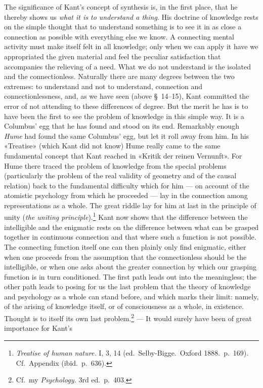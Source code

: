 \documentclass[12pt,a4paper]{article}
\newcommand{\opage}[1]{\marginnote{\footnotesize\textit{[#1]}}}
\begin{document}
The significance of Kant's concept of synthesis is, in the first place, that
he thereby shows us \emph{what it is to understand a thing}. His doctrine of
knowledge rests on the simple thought that to understand something is to see
it in as close a connection as possible with everything else we know. A
connecting mental activity must make itself felt in all knowledge; only when
we can apply it have we appropriated the given material and feel the peculiar
satisfaction that accompanies the relieving of a need. What we do not
understand is the isolated and the connectionless. Naturally there are many
degrees between the two extremes: to understand and not to understand,
connection and connectionlessness, and, as we have seen (above §\ 14--15),
Kant committed the error of not attending to these differences of degree. But
the merit he has is to have been the first to see the problem of knowledge in
this simple way. It is a Columbus' egg that he has found and stood on its end.
Remarkably enough \emph{Hume} had found the same Columbus' egg, but let it roll away
from him. In his «Treatise» (which Kant did not know) Hume really came to the
same fundamental concept that Kant reached in «Kritik der reinen Vernunft».
For Hume there traced the problem of knowledge from the special problems
(particularly the problem of the real validity of geometry and of the causal
relation) back to the fundamental difficulty which for him --- on account of
the atomistic psychology from which he proceeded --- lay in the connection
among representations as a whole. The great riddle lay for him at last in the
principle of unity (\textit{the uniting principle}).\footnote{\textit{Treatise
of human nature.} I, 3, 14 (ed.\ Selby-Bigge.\ Oxford 1888.\ p.\ 169). Cf.\
Appendix (ibid.\ p.\ 636).} Kant now shows that the difference between the
intelligible and the enigmatic rests on the difference between what can be
grasped together in continuous connection and that where such a function is
not possible. The connecting function itself one can then plainly only find
enigmatic, either when one proceeds from the assumption that the
connectionless should be the intelligible, or when one asks about the greater
connection by which our grasping function is in turn conditioned. The first
path leads out into the meaningless; the other path leads \opage{57}to posing for us
the last problem that the theory of knowledge and psychology as a whole can
stand before, and which marks their limit: namely, of the arising of
knowledge itself, or of consciousness as a whole, in existence. Thought is to
itself its own last problem.\footnote{Cf.\ my \textit{Psychology.} 3rd ed.\
p.\ 403.} --- It would surely have been of great importance for Kant's
\end{document}
